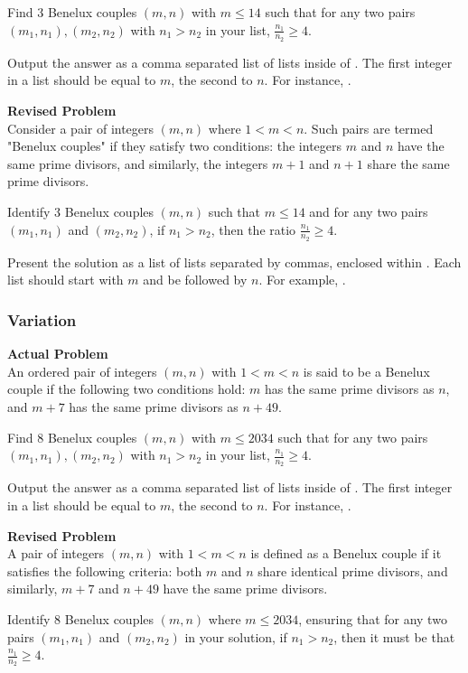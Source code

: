 Find 3 Benelux couples $(m, n)$ with $m \leqslant 14$ such that for any two pairs $(m_1, n_1), (m_2, n_2)$ with $n_1 > n_2$ in your list, $\frac{n_1}{n_2} \geqslant 4$.

Output the answer as a comma separated list of lists inside of . The first integer in a list should be equal to $m$, the second to $n$. For instance, .

\textbf{Revised Problem}\\
Consider a pair of integers $(m, n)$ where $1 < m < n$. Such pairs are termed "Benelux couples" if they satisfy two conditions: the integers $m$ and $n$ have the same prime divisors, and similarly, the integers $m + 1$ and $n + 1$ share the same prime divisors.

Identify 3 Benelux couples $(m, n)$ such that $m \leq 14$ and for any two pairs $(m_1, n_1)$ and $(m_2, n_2)$, if $n_1 > n_2$, then the ratio $\frac{n_1}{n_2} \geq 4$.

Present the solution as a list of lists separated by commas, enclosed within . Each list should start with $m$ and be followed by $n$. For example, .

\subsubsection{Variation}
\textbf{Actual Problem}\\
An ordered pair of integers $(m, n)$ with $1 < m < n$ is said to be a Benelux couple if the following two conditions hold: $m$ has the same prime divisors as $n$, and $m + 7$ has the same prime divisors as $n + 49$.

Find 8 Benelux couples $(m, n)$ with $m \leqslant 2034$ such that for any two pairs $(m_1, n_1), (m_2, n_2)$ with $n_1 > n_2$ in your list, $\frac{n_1}{n_2} \geqslant 4$.

Output the answer as a comma separated list of lists inside of . The first integer in a list should be equal to $m$, the second to $n$. For instance, .

\textbf{Revised Problem}\\
A pair of integers $(m, n)$ with $1 < m < n$ is defined as a Benelux couple if it satisfies the following criteria: both $m$ and $n$ share identical prime divisors, and similarly, $m + 7$ and $n + 49$ have the same prime divisors.

Identify 8 Benelux couples $(m, n)$ where $m \leq 2034$, ensuring that for any two pairs $(m_1, n_1)$ and $(m_2, n_2)$ in your solution, if $n_1 > n_2$, then it must be that $\frac{n_1}{n_2} \geq 4$.

